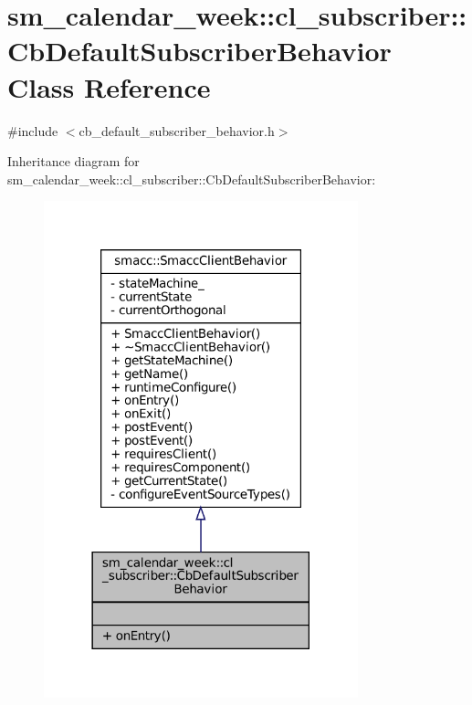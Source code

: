 \hypertarget{classsm__calendar__week_1_1cl__subscriber_1_1CbDefaultSubscriberBehavior}{}\section{sm\+\_\+calendar\+\_\+week\+:\+:cl\+\_\+subscriber\+:\+:Cb\+Default\+Subscriber\+Behavior Class Reference}
\label{classsm__calendar__week_1_1cl__subscriber_1_1CbDefaultSubscriberBehavior}


{\ttfamily \#include $<$cb\+\_\+default\+\_\+subscriber\+\_\+behavior.\+h$>$}



Inheritance diagram for sm\+\_\+calendar\+\_\+week\+:\+:cl\+\_\+subscriber\+:\+:Cb\+Default\+Subscriber\+Behavior\+:
\nopagebreak
\begin{figure}[H]
\begin{center}
\leavevmode
\includegraphics[width=258pt]{classsm__calendar__week_1_1cl__subscriber_1_1CbDefaultSubscriberBehavior__inherit__graph}
\end{center}
\end{figure}


